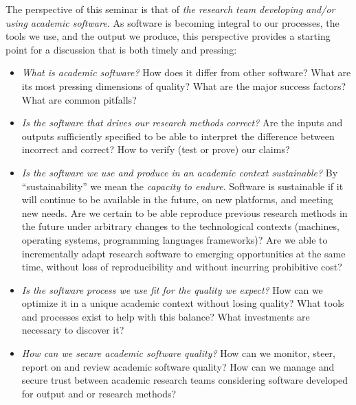 \documentclass[a4paper,UKenglish]{dagman}
\begin{document}
The perspective of this seminar is that of \emph{the research team developing and/or using academic software.} 
As software is becoming integral to our processes, the tools we use, and the output we produce, this perspective provides a starting point for a discussion that is both timely and pressing:

\begin{itemize}
\item \emph{What is academic software?} How does it differ from other software? What are its most pressing dimensions of quality? What are the major success factors? What are common pitfalls?
\item \emph{Is the software that drives our research methods correct?} Are the inputs and outputs sufficiently specified to be able to interpret the difference between incorrect and correct? How to verify (test or prove) our claims?
\item \emph{Is the software we use and produce in an academic context sustainable?}
By ``sustainability'' we mean the \emph{capacity to endure}. Software is sustainable if it will continue to be available in the future, on new platforms, and meeting new needs. 
Are we certain to be able reproduce previous research methods in the future under arbitrary changes to the technological contexts (machines, operating systems, programming languages frameworks)? Are we able to incrementally adapt research software to emerging opportunities at the same time, without loss of reproducibility and without incurring prohibitive cost?
\item \emph{Is the software process we use fit for the quality we expect?} How can we optimize it in a unique academic context without losing quality? What tools and processes exist to help with this balance? What investments are necessary to discover it?
\item \emph{How can we secure academic software quality?} How can we monitor, steer, report on and review academic software quality? How can we manage and secure trust between academic research teams considering software developed for output and or research methods?

\end{itemize}
\end{document}
